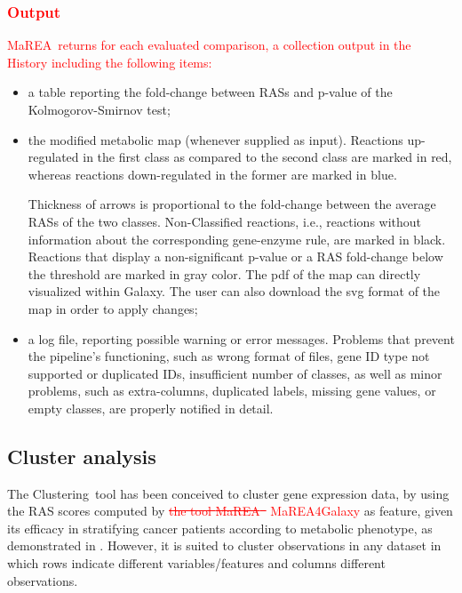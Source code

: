 \documentclass[preprint,12pt,authoryear]{elsarticle}
\newcommand{\red}{\textcolor{red}}
\newcommand{\mareagalaxy}{\textsf{MaREA4Galaxy}}
\newcommand{\mareaTool}{\textsf{MaREA}}
\newcommand{\clusterTool}{\textsf{Clustering}}
\begin{document}
\red{\subsubsection{Output}}

\red{\mareaTool\ returns for each evaluated comparison, a collection
  output in the History including the following items:}

\begin{itemize}
\item a table reporting the fold-change between RASs and p-value of
  the Kolmogorov-Smirnov test;
  
\item the modified metabolic map (whenever supplied as
  input). Reactions up-regulated in the first class as compared to the
  second class  are marked in red, whereas reactions down-regulated in
  the former are marked in blue.
  
  Thickness of arrows is proportional to the fold-change between the
  average RASs of the two classes. Non-Classified reactions, i.e.,
  reactions without information about the corresponding gene-enzyme
  rule, are marked in black.
  Reactions that display a non-significant p-value or a RAS
  fold-change below the threshold are marked in gray color. The pdf of
  the map can directly visualized within Galaxy. The user can also
  download the svg format of the map in order to apply changes;
  
\item a log file, reporting possible warning or error
  messages. Problems that prevent the pipeline's functioning, such as
  wrong format of files, gene ID type not supported or duplicated IDs,
  insufficient number of classes, as well as minor problems, such as
  extra-columns, duplicated labels, missing gene values, or empty
  classes, are properly notified in detail.
\end{itemize}


\subsection{Cluster analysis}

The \clusterTool~tool has been conceived to cluster gene expression
data, by using the RAS scores computed by \red{\sout{the tool
    \mareaTool~} \mareagalaxy} as feature, given its efficacy in
stratifying cancer patients according to metabolic phenotype, as
demonstrated in \citep{marea}. However, it is suited to cluster
observations in any dataset in which rows indicate different
variables/features and columns different observations.
\end{document}
